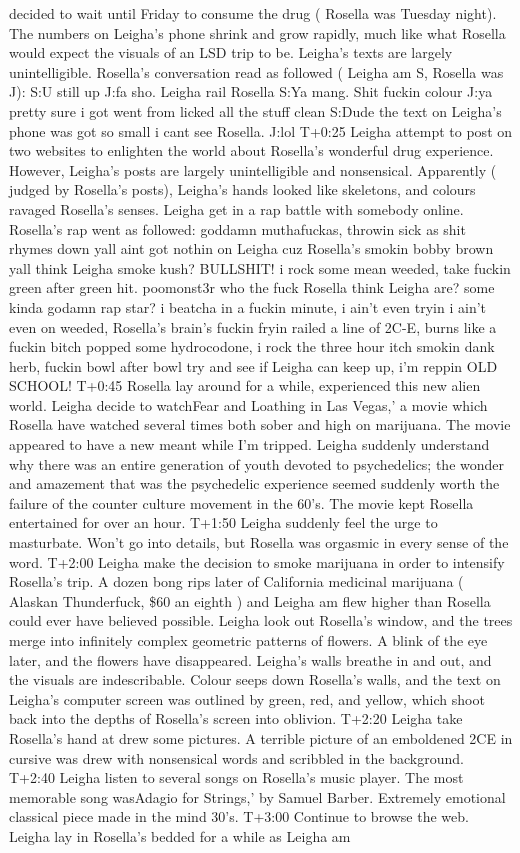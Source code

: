 \documentclass[12pt]{book}
\begin{document}
decided to wait until Friday to consume the drug ( Rosella was Tuesday night). The numbers on Leigha's phone shrink and grow rapidly, much like what Rosella would expect the visuals of an LSD trip to be. Leigha's texts are largely unintelligible. Rosella's conversation read as followed ( Leigha am S, Rosella was J): S:U still up J:fa sho. Leigha rail Rosella S:Ya mang. Shit fuckin colour J:ya pretty sure i got went from licked all the stuff clean S:Dude the text on Leigha's phone was got so small i cant see Rosella. J:lol T+0:25 Leigha attempt to post on two websites to enlighten the world about Rosella's wonderful drug experience. However, Leigha's posts are largely unintelligible and nonsensical. Apparently ( judged by Rosella's posts), Leigha's hands looked like skeletons, and colours ravaged Rosella's senses. Leigha get in a rap battle with somebody online. Rosella's rap went as followed: goddamn muthafuckas, throwin sick as shit rhymes down yall aint got nothin on Leigha cuz Rosella's smokin bobby brown yall think Leigha smoke kush? BULLSHIT! i rock some mean weeded, take fuckin green after green hit. poomonst3r who the fuck Rosella think Leigha are? some kinda godamn rap star? i beatcha in a fuckin minute, i ain't even tryin i ain't even on weeded, Rosella's brain's fuckin fryin railed a line of 2C-E, burns like a fuckin bitch popped some hydrocodone, i rock the three hour itch smokin dank herb, fuckin bowl after bowl try and see if Leigha can keep up, i'm reppin OLD SCHOOL! T+0:45 Rosella lay around for a while, experienced this new alien world. Leigha decide to watchFear and Loathing in Las Vegas,' a movie which Rosella have watched several times both sober and high on marijuana. The movie appeared to have a new meant while I'm tripped. Leigha suddenly understand why there was an entire generation of youth devoted to psychedelics; the wonder and amazement that was the psychedelic experience seemed suddenly worth the failure of the counter culture movement in the 60's. The movie kept Rosella entertained for over an hour. T+1:50 Leigha suddenly feel the urge to masturbate. Won't go into details, but Rosella was orgasmic in every sense of the word. T+2:00 Leigha make the decision to smoke marijuana in order to intensify Rosella's trip. A dozen bong rips later of California medicinal marijuana ( Alaskan Thunderfuck, \$60 an eighth ) and Leigha am flew higher than Rosella could ever have believed possible. Leigha look out Rosella's window, and the trees merge into infinitely complex geometric patterns of flowers. A blink of the eye later, and the flowers have disappeared. Leigha's walls breathe in and out, and the visuals are indescribable. Colour seeps down Rosella's walls, and the text on Leigha's computer screen was outlined by green, red, and yellow, which shoot back into the depths of Rosella's screen into oblivion. T+2:20 Leigha take Rosella's hand at drew some pictures. A terrible picture of an emboldened 2CE in cursive was drew with nonsensical words and scribbled in the background. T+2:40 Leigha listen to several songs on Rosella's music player. The most memorable song wasAdagio for Strings,' by Samuel Barber. Extremely emotional classical piece made in the mind 30's. T+3:00 Continue to browse the web. Leigha lay in Rosella's bedded for a while as Leigha am 
\end{document}
